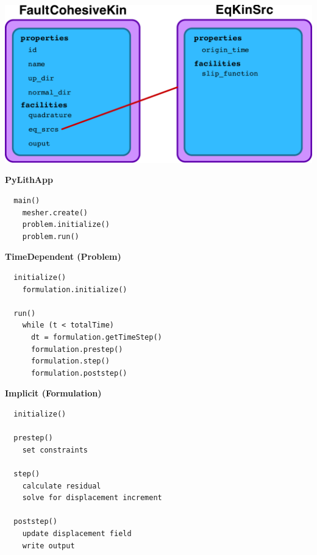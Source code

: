 \documentclass[pdftex,cig,slideColor]{pp4slides}
\begin{document}
  \vfill
  \begin{center}
    \includegraphics[scale=1.0]{figs/faultcohesivekin}
  \end{center}  
  \vfill

  \summary{}
 {\small
  \begin{minipage}[t]{3.75in}
    {\bf PyLithApp}\\[8pt]
    \begin{verbatim}
  main()
    mesher.create()
    problem.initialize()
    problem.run()
    \end{verbatim}
    \vspace*{20pt}
    {\bf TimeDependent (Problem)}\\[8pt]
    \begin{verbatim}
  initialize()
    formulation.initialize()

  run()
    while (t < totalTime)
      dt = formulation.getTimeStep()
      formulation.prestep()
      formulation.step()
      formulation.poststep()
\end{verbatim}
  \end{minipage}
  \hfill
  \begin{minipage}[t]{3.75in}
    {\bf Implicit (Formulation)}\\[8pt]
    \begin{verbatim}
  initialize()

  prestep()
    set constraints

  step()
    calculate residual
    solve for displacement increment

  poststep()
    update displacement field
    write output
\end{verbatim}
  \end{minipage}
}

\end{document}

